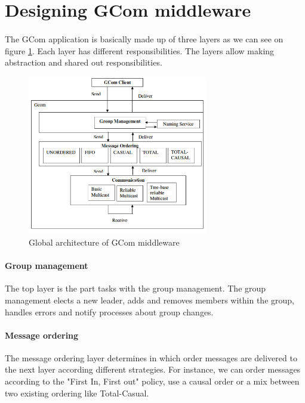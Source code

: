 \section{Designing GCom middleware}

\paragraph{}{
	The GCom application is basically made up of three layers as
 we can see on figure \ref{fig:architecture}.
 Each layer has different responsibilities. The layers allow 
 making abstraction and shared out responsibilities.
}

\begin{figure}[!ht]
	\begin{center}
	\includegraphics[width=0.7\textwidth]{figures/gcom_architecture.png}
	\end{center}
	\caption{Global architecture of GCom middleware}
	\label{fig:architecture}
\end{figure}

\paragraph{Group management}{
	The top layer is the part tasks with the group management.
 The group management elects a new leader, adds and removes
 members within the group, handles errors and notify processes
 about group changes.
}

\paragraph{Message ordering}{
	The message ordering layer determines in which order
 messages are delivered to the next layer according different
 strategies. For instance, we can order messages according to the
 "First In, First out" policy, use a causal order or a mix
 between two existing ordering like Total-Casual.
}

